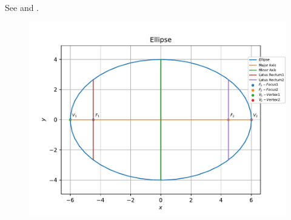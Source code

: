 See 
and 
.
\begin{figure}[!h]
	\begin{center}
		\includegraphics[width=\columnwidth]{chapters/11/11/3/1/figs/problem1.pdf}
	\end{center}
\caption{}
\label{fig:chapters/11/11/3/1/Fig1}
\end{figure}
